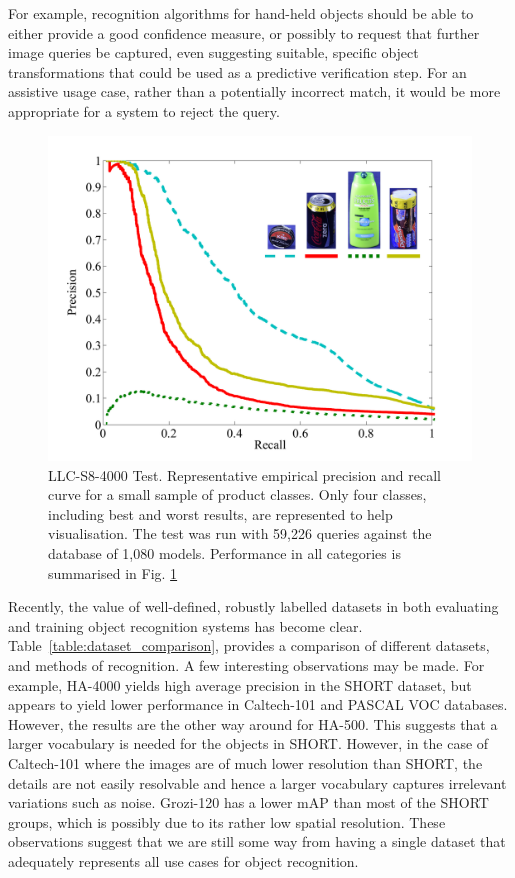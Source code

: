 For example, recognition algorithms for hand-held objects should be able to either provide a good confidence measure, or possibly to request that further image queries be captured, even suggesting suitable, specific object transformations that could be used as a predictive verification step. For an assistive usage case, rather than a potentially incorrect match, it would be more appropriate for a system to reject the query.

\begin{figure}[h]
       \centering
		\includegraphics[width=\linewidth]{./gfx/Chapter03/precision-recall.pdf}
        \caption{LLC-S8-4000 Test. Representative empirical precision and recall curve for a small sample of product classes. Only four classes, including best and worst results, are represented to help visualisation. The test was run with 59,226 queries against the database of 1,080 models. Performance in all categories is summarised in Fig. \ref{fig:LLC-S8-4000}}
        \label{fig:LLC-S8-4000}
\end{figure}

Recently, the value of well-defined, robustly labelled datasets in both evaluating and training object recognition systems has become clear. Table~\ref{table:dataset_comparison}, provides a comparison of different datasets, and methods of recognition.  A few interesting observations may be made. For example, HA-4000 yields high average precision in the SHORT dataset, but appears to yield lower performance in Caltech-101 and PASCAL VOC databases. However, the results are the other way around for HA-500.  This suggests that a larger vocabulary is needed for the objects in SHORT. However, in the case of Caltech-101 where the images are of much lower resolution than SHORT, the details are not easily resolvable and hence a larger vocabulary captures irrelevant variations such as noise. Grozi-120 has a lower mAP than most of the SHORT groups, which is possibly due to its rather low spatial resolution. These observations suggest that we are still some way from having a single dataset that adequately represents all use cases for object recognition.


